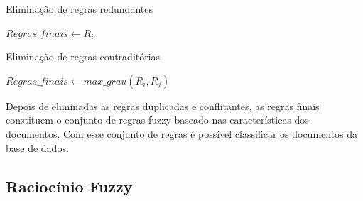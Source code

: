\documentclass[template.tex]{subfiles}
\begin{document}
\begin{algorithm}
\begin{algorithmic}[1]
\caption{Eliminação de regras redundantes}
\label{alg-regras-repetidas}
           \STATE $Regras\_finais \leftarrow R_i$
       \ENDIF    
   \ENDFOR
\ENDFOR
\end{algorithmic}
\end{algorithm}

\begin{algorithm}
\begin{algorithmic}[1]
\caption{Eliminação de regras contraditórias}
\label{alg-regras-contraditorias}
           \STATE $Regras\_finais \leftarrow max\_grau(R_i,R_j)$
       \ENDIF    
   \ENDFOR
\ENDFOR
\end{algorithmic}
\end{algorithm}


%

Depois de eliminadas as regras duplicadas e conflitantes, as regras finais constituem o conjunto de regras fuzzy baseado nas características dos documentos. Com esse conjunto de regras é possível classificar os documentos da base de dados. 


\subsection{Raciocínio Fuzzy}
\end{document}
